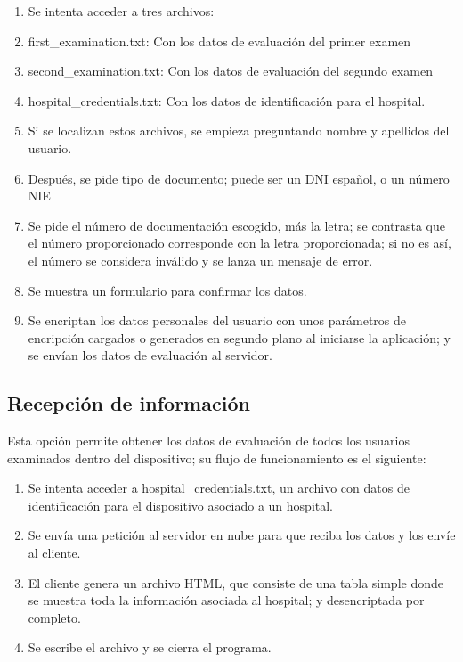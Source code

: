 \documentclass[12pt,a4paper,twoside,openright]{book}
\begin{document}
\begin{enumerate}
  \item Se intenta acceder a tres archivos:
  \item[\textbullet] first\_examination.txt: Con los datos de evaluación del primer examen
  \item[\textbullet] second\_examination.txt: Con los datos de evaluación del segundo examen
  \item[\textbullet] hospital\_credentials.txt: Con los datos de identificación para el hospital.
  \item Si se localizan estos archivos, se empieza preguntando nombre y apellidos del usuario.
  \item Después, se pide tipo de documento; puede ser un DNI español, o un número NIE 
  \item Se pide el número de documentación escogido, más la letra; se contrasta que el número proporcionado corresponde con la letra proporcionada; si no es así, el número se considera inválido y se lanza un mensaje de error.
  \item Se muestra un formulario para confirmar los datos.
  \item Se encriptan los datos personales del usuario con unos parámetros de encripción cargados o generados en segundo plano al iniciarse la aplicación; y se envían los datos de evaluación al servidor.
\end{enumerate}


\subsection{Recepción de información}

Esta opción permite obtener los datos de evaluación de todos los usuarios examinados dentro del dispositivo; su flujo de funcionamiento es el siguiente:

\begin{enumerate}
  \item Se intenta acceder a hospital\_credentials.txt, un archivo con datos de identificación para el dispositivo asociado a un hospital.
  \item Se envía una petición al servidor en nube para que reciba los datos y los envíe al cliente.
  \item El cliente genera un archivo HTML, que consiste de una tabla simple donde se muestra toda la información asociada al hospital; y desencriptada por completo.
  \item Se escribe el archivo y se cierra el programa.
\end{enumerate}
\end{document}
